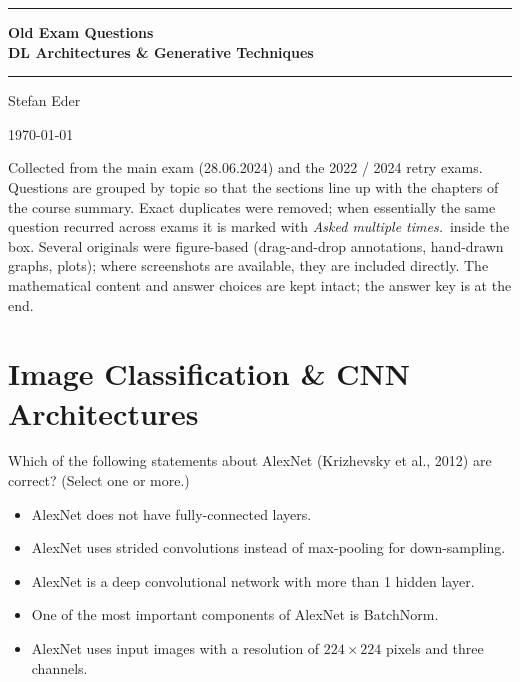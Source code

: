 \documentclass[11pt,oneside]{article}
\newcommand{\coursetitle}{DL Architectures \& Generative Techniques}
\newcounter{question}
\newcommand{\questiontitle}[1]{%
  \stepcounter{question}\begin{qbox}[Question \thequestion: #1]}
\newcommand{\closequestion}{\end{qbox}}
\newcommand{\repeatnote}{\textit{\color{gray!70}Asked multiple times.}}
\newcommand{\choice}{\item[$\square$] }
\begin{document}
\thispagestyle{empty}
\vspace*{1.4cm}
\begin{center}
  {\color{accent}\rule{\linewidth}{1.8pt}}\par
  \vspace{0.65cm}
  {\fontsize{26}{32}\selectfont\bfseries\color{accent}Old Exam Questions\\[2pt] \coursetitle\par}
  \vspace{0.55cm}
  {\color{accent!35}\rule{\linewidth}{0.5pt}}\par
  \vspace{0.55cm}
  {\large Stefan Eder\par}
  \vspace{0.15cm}
  {\small\color{gray!70}\today\par}
\end{center}

\vspace{0.9cm}
\begin{notebox}
Collected from the main exam (28.06.2024) and the 2022 / 2024 retry exams. Questions are
grouped by topic so that the sections line up with the chapters of the course summary.
Exact duplicates were removed; when essentially the same question recurred across exams it is
marked with \repeatnote\ inside the box. Several originals were figure-based (drag-and-drop
annotations, hand-drawn graphs, plots); where screenshots are available, they are included
directly. The mathematical content and answer choices are kept intact; the answer key is at the end.
\end{notebox}

\tableofcontents
\newpage


\section{Image Classification \& CNN Architectures}

\questiontitle{AlexNet}
Which of the following statements about AlexNet (Krizhevsky et al., 2012) are correct?
(Select one or more.)
\begin{itemize}[leftmargin=1.8em]
  \choice AlexNet does not have fully-connected layers.
  \choice AlexNet uses strided convolutions instead of max-pooling for down-sampling.
  \choice AlexNet is a deep convolutional network with more than 1 hidden layer.
  \choice One of the most important components of AlexNet is BatchNorm.
  \choice AlexNet uses input images with a resolution of $224\times224$ pixels and three channels.
\end{itemize}
\closequestion
\end{document}

